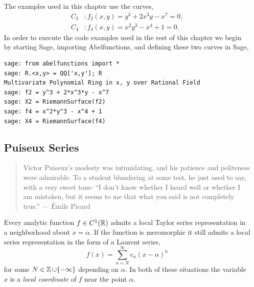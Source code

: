 The examples used in this chapter use the curves,
\begin{align}
  C_2 &:  f_2(x,y) = y^3 + 2x^3y - x^7 = 0, \label{eq:example-curve-f2} \\
  C_4 &:  f_4(x,y) = x^2y^3 - x^4 + 1 = 0. \label{eq:example-curve-f4}
\end{align}
In order to execute the code examples used in the rest of this chapter we begin
by starting Sage, importing Abelfunctions, and defining these two curves in
Sage,
\begin{lstlisting}
sage: from abelfunctions import *
sage: R.<x,y> = QQ['x,y']; R
Multivariate Polynomial Ring in x, y over Rational Field
sage: f2 = y^3 + 2*x^3*y - x^7
sage: X2 = RiemannSurface(f2)
sage: f4 = x^2*y^3 - x^4 + 1
sage: X4 = RiemannSurface(f4)
\end{lstlisting}


\subsection{Puiseux Series}\label{subsec:background-puiseux-series}

\begin{quote}
  Victor Puiseux's modesty was intimidating, and his patience and politeness
  were admirable. To a student blundering at some test, he just used to say,
  with a very sweet tone: ``I don't know whether I heard well or whether I am
  mistaken, but it seems to me that what you said is not completely true.'' ---
  \'{E}mile Picard
\end{quote}

Every analytic function $f \in C^1(\operatorname{\mathbb{R}})$ admits a local Taylor series
representation in a neighborhood about $x = \alpha$. If the function is
meromorphic it still admits a local series representation in the form of a
Laurent series,
\[
    f(x) = \sum_{n=N}^\infty c_n (x-\alpha)^n
\]
for some $N \in \operatorname{\mathbb{Z}} \cup \{-\infty\}$ depending on $\alpha$. In both of these
situations the variable $x$ is a {\it local coordinate} of $f$ near the point
$\alpha$.

